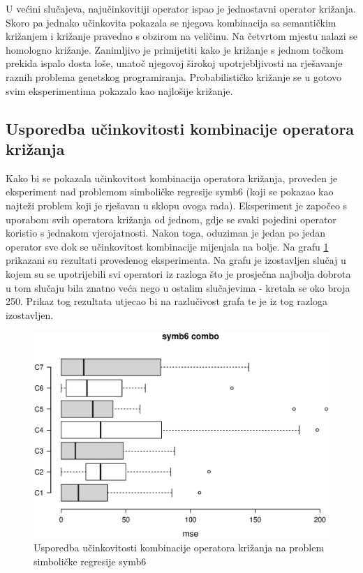 U većini slučajeva, najučinkovitiji operator ispao je jednostavni operator križanja. Skoro pa jednako učinkovita pokazala se njegova kombinacija sa semantičkim križanjem i križanje pravedno s obzirom na veličinu. Na četvrtom mjestu nalazi se homologno križanje. Zanimljivo je primijetiti kako je križanje s jednom točkom prekida ispalo dosta loše, unatoč njegovoj širokoj upotrjebljivosti na rješavanje raznih problema genetskog programiranja. Probabilističko križanje se u gotovo svim eksperimentima pokazalo kao najlošije križanje.

\subsection{Usporedba učinkovitosti kombinacije operatora križanja}

Kako bi se pokazala učinkovitost kombinacija operatora križanja, proveden je eksperiment nad problemom simboličke regresije symb6 (koji se pokazao kao najteži problem koji je rješavan u sklopu ovoga rada). Eksperiment je započeo s uporabom svih operatora križanja od jednom, gdje se svaki pojedini operator koristio s jednakom vjerojatnosti. Nakon toga, oduziman je jedan po jedan operator sve dok se učinkovitost kombinacije mijenjala na bolje. Na grafu \ref{symb6combo} prikazani su rezultati provedenog eksperimenta. Na grafu je izostavljen slučaj u kojem su se upotrijebili svi operatori iz razloga što je prosječna najbolja dobrota u tom slučaju bila znatno veća nego u ostalim slučajevima - kretala se oko broja 250. Prikaz tog rezultata utjecao bi na razlučivost grafa te je iz tog razloga izostavljen. 

\begin{figure}[H]
	\centering
	\includegraphics[trim=4cm 4cm 0cm 0cm, scale=0.6]{./slike/boxPlots/symb6-combo.eps}
	\caption{Usporedba učinkovitosti kombinacije operatora križanja na problem simboličke regresije symb6}
	\label{symb6combo}
\end{figure}

